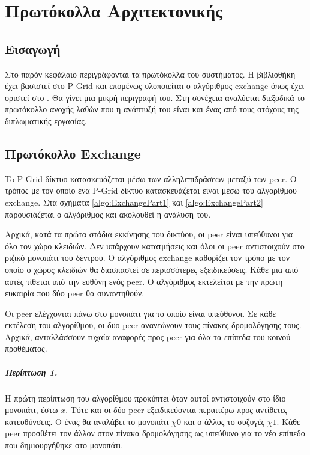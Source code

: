 \chapter{Πρωτόκολλα Αρχιτεκτονικής}
\label{chap:Protocols}

\section{Εισαγωγή}

Στο παρόν κεφάλαιο περιγράφονται τα πρωτόκολλα του συστήματος. Η βιβλιοθήκη 
έχει βασιστεί στο P-Grid και επομένως υλοποιείται ο αλγόριθμος exchange 
όπως έχει οριστεί στο \citep{Abererb}. Θα γίνει μια μικρή περιγραφή του. 
Στη συνέχεια αναλύεται διεξοδικά το πρωτόκολλο ανοχής λαθών που η ανάπτυξή 
του είναι και ένας από τους στόχους της διπλωματικής εργασίας.

\section{Πρωτόκολλο Exchange}

To P-Grid δίκτυο κατασκευάζεται μέσω των αλληλεπιδράσεων μεταξύ των peer. 
Ο τρόπος με τον οποίο ένα P-Grid δίκτυο κατασκευάζεται είναι μέσω του 
αλγορίθμου exchange. Στα σχήματα \ref{algo:ExchangePart1} και 
\ref{algo:ExchangePart2} παρουσιάζεται ο αλγόριθμος και ακολουθεί η 
ανάλυση του.

Αρχικά, κατά τα πρώτα στάδια εκκίνησης του δικτύου, οι peer είναι υπεύθυνοι 
για όλο τον χώρο κλειδιών. Δεν υπάρχουν κατατμήσεις και όλοι οι peer 
αντιστοιχούν στο ριζικό μονοπάτι του δέντρου. Ο αλγόριθμος exchange 
καθορίζει τον τρόπο με τον οποίο ο χώρος κλειδιών θα διασπαστεί σε 
περισσότερες εξειδικεύσεις. Κάθε μια από αυτές τίθεται υπό την ευθύνη 
ενός peer. Ο αλγόριθμος εκτελείται με την πρώτη ευκαιρία που δύο peer 
θα συναντηθούν.

Οι peer ελέγχονται πάνω στο μονοπάτι για το οποίο είναι υπεύθυνοι. 
Σε κάθε εκτέλεση του αλγορίθμου, οι δυο peer ανανεώνουν τους πίνακες 
δρομολόγησης τους. Αρχικά, ανταλλάσσουν τυχαία αναφορές προς peer για όλα 
τα επίπεδα του κοινού προθέματος.

\paragraph{Περίπτωση 1.} Η πρώτη περίπτωση του αλγορίθμου προκύπτει όταν 
αυτοί αντιστοιχούν στο ίδιο μονοπάτι, έστω $x$. Τότε και οι δύο peer 
εξειδικεύονται περαιτέρω προς αντίθετες κατευθύνσεις. Ο ένας θα αναλάβει 
το μονοπάτι $χ0$ και ο άλλος το συζυγές $χ1$. Κάθε peer προσθέτει τον άλλον 
στον πίνακα δρομολόγησης ως υπεύθυνο για το νέο επίπεδο που δημιουργήθηκε 
στο μονοπάτι.

